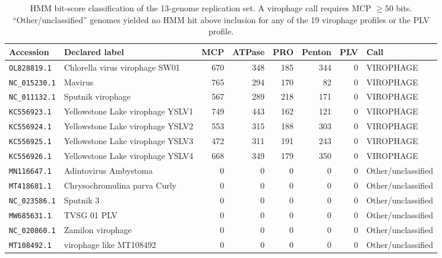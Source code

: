 \begin{table}[H]
\centering\small
\caption{HMM bit-score classification of the 13-genome replication set.
A virophage call requires MCP $\geq 50$ bits. ``Other/unclassified''
genomes yielded no HMM hit above inclusion for any of the 19 virophage
profiles or the PLV profile.}
\label{tab:summary}
\begin{tabular}{llrrrrrl}
\toprule
Accession & Declared label & MCP & ATPase & PRO & Penton & PLV & Call \\
\midrule
\texttt{OL828819.1} & Chlorella virus virophage SW01 & 670 & 348 & 185 & 344 & 0 & VIROPHAGE \\
\texttt{NC\_015230.1} & Mavirus & 765 & 294 & 170 & 82 & 0 & VIROPHAGE \\
\texttt{NC\_011132.1} & Sputnik virophage & 567 & 289 & 218 & 171 & 0 & VIROPHAGE \\
\texttt{KC556923.1} & Yellowstone Lake virophage YSLV1 & 749 & 443 & 162 & 121 & 0 & VIROPHAGE \\
\texttt{KC556924.1} & Yellowstone Lake virophage YSLV2 & 553 & 315 & 188 & 303 & 0 & VIROPHAGE \\
\texttt{KC556925.1} & Yellowstone Lake virophage YSLV3 & 472 & 311 & 191 & 243 & 0 & VIROPHAGE \\
\texttt{KC556926.1} & Yellowstone Lake virophage YSLV4 & 668 & 349 & 179 & 350 & 0 & VIROPHAGE \\
\texttt{MN116647.1} & Adintovirus Ambystoma & 0 & 0 & 0 & 0 & 0 & Other/unclassified \\
\texttt{MT418681.1} & Chrysochromulina parva Curly & 0 & 0 & 0 & 0 & 0 & Other/unclassified \\
\texttt{NC\_023586.1} & Sputnik 3 & 0 & 0 & 0 & 0 & 0 & Other/unclassified \\
\texttt{MW685631.1} & TVSG 01 PLV & 0 & 0 & 0 & 0 & 0 & Other/unclassified \\
\texttt{NC\_020860.1} & Zamilon virophage & 0 & 0 & 0 & 0 & 0 & Other/unclassified \\
\texttt{MT108492.1} & virophage like MT108492 & 0 & 0 & 0 & 0 & 0 & Other/unclassified \\
\bottomrule
\end{tabular}
\end{table}

